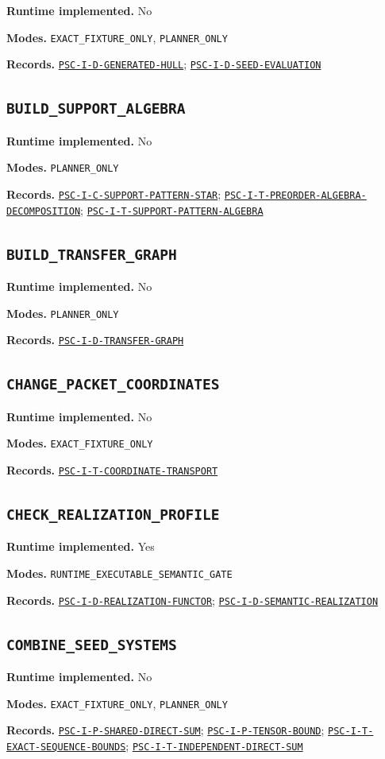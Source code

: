 \documentclass[a4paper,11pt]{article}
\newcommand{\field}[2]{\noindent\textbf{#1.} #2\par}
\begin{document}
\field{Runtime implemented}{No}
\field{Modes}{\nolinkurl{EXACT_FIXTURE_ONLY}, \nolinkurl{PLANNER_ONLY}}
\field{Records}{\hyperref[rec:PSC-I-D-GENERATED-HULL]{\nolinkurl{PSC-I-D-GENERATED-HULL}}; \hyperref[rec:PSC-I-D-SEED-EVALUATION]{\nolinkurl{PSC-I-D-SEED-EVALUATION}}}
\subsection*{\nolinkurl{BUILD_SUPPORT_ALGEBRA}}
\field{Runtime implemented}{No}
\field{Modes}{\nolinkurl{PLANNER_ONLY}}
\field{Records}{\hyperref[rec:PSC-I-C-SUPPORT-PATTERN-STAR]{\nolinkurl{PSC-I-C-SUPPORT-PATTERN-STAR}}; \hyperref[rec:PSC-I-T-PREORDER-ALGEBRA-DECOMPOSITION]{\nolinkurl{PSC-I-T-PREORDER-ALGEBRA-DECOMPOSITION}}; \hyperref[rec:PSC-I-T-SUPPORT-PATTERN-ALGEBRA]{\nolinkurl{PSC-I-T-SUPPORT-PATTERN-ALGEBRA}}}
\subsection*{\nolinkurl{BUILD_TRANSFER_GRAPH}}
\field{Runtime implemented}{No}
\field{Modes}{\nolinkurl{PLANNER_ONLY}}
\field{Records}{\hyperref[rec:PSC-I-D-TRANSFER-GRAPH]{\nolinkurl{PSC-I-D-TRANSFER-GRAPH}}}
\subsection*{\nolinkurl{CHANGE_PACKET_COORDINATES}}
\field{Runtime implemented}{No}
\field{Modes}{\nolinkurl{EXACT_FIXTURE_ONLY}}
\field{Records}{\hyperref[rec:PSC-I-T-COORDINATE-TRANSPORT]{\nolinkurl{PSC-I-T-COORDINATE-TRANSPORT}}}
\subsection*{\nolinkurl{CHECK_REALIZATION_PROFILE}}
\field{Runtime implemented}{Yes}
\field{Modes}{\nolinkurl{RUNTIME_EXECUTABLE_SEMANTIC_GATE}}
\field{Records}{\hyperref[rec:PSC-I-D-REALIZATION-FUNCTOR]{\nolinkurl{PSC-I-D-REALIZATION-FUNCTOR}}; \hyperref[rec:PSC-I-D-SEMANTIC-REALIZATION]{\nolinkurl{PSC-I-D-SEMANTIC-REALIZATION}}}
\subsection*{\nolinkurl{COMBINE_SEED_SYSTEMS}}
\field{Runtime implemented}{No}
\field{Modes}{\nolinkurl{EXACT_FIXTURE_ONLY}, \nolinkurl{PLANNER_ONLY}}
\field{Records}{\hyperref[rec:PSC-I-P-SHARED-DIRECT-SUM]{\nolinkurl{PSC-I-P-SHARED-DIRECT-SUM}}; \hyperref[rec:PSC-I-P-TENSOR-BOUND]{\nolinkurl{PSC-I-P-TENSOR-BOUND}}; \hyperref[rec:PSC-I-T-EXACT-SEQUENCE-BOUNDS]{\nolinkurl{PSC-I-T-EXACT-SEQUENCE-BOUNDS}}; \hyperref[rec:PSC-I-T-INDEPENDENT-DIRECT-SUM]{\nolinkurl{PSC-I-T-INDEPENDENT-DIRECT-SUM}}}
\end{document}
